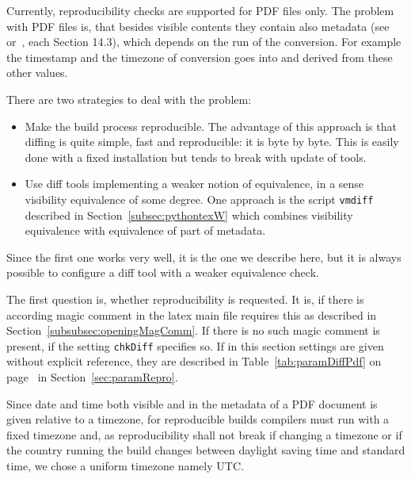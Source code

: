 Currently, reproducibility checks are supported for PDF files only. 
The problem with PDF files is, that besides visible contents 
they contain also metadata (see~\cite{Pdf17} or~\cite{Pdf20}, each Section 14.3), 
which depends on the run of the conversion. 
For example the timestamp and the timezone of conversion goes into 
and derived from these other values. 

There are two strategies to deal with the problem: 
%
\begin{itemize}
  \item 
  Make the build process reproducible. 
  The advantage of this approach is that diffing is quite simple, 
  fast and reproducible: it is byte by byte. 
  This is easily done with a fixed installation 
  but tends to break with update of tools. 
  \item 
  Use diff tools implementing a weaker notion of equivalence, 
  in a sense visibility equivalence of some degree. 
  One approach is the script \texttt{vmdiff} 
  described in Section~\ref{subsec:pythontexW} 
  which combines visibility equivalence 
  with equivalence of part of metadata. 
\end{itemize}%

Since the first one works very well, it is the one we describe here, 
but it is always possible to configure a diff tool with a weaker equivalence check. 

The first question is, whether reproducibility is requested. 
It is, if there is according magic comment in the latex main file requires this 
as described in Section~\ref{subsubsec:openingMagComm}. 
If there is no such magic comment is present, if the setting \texttt{chkDiff} specifies so. 
If in this section settings are given without explicit reference, 
they are described in Table~\ref{tab:paramDiffPdf} on page~\pageref{tab:paramDiffPdf} 
in Section~\ref{sec:paramRepro}. 

Since date and time both visible and in the metadata of a PDF document 
is given relative to a timezone, 
for reproducible builds compilers must run with a fixed timezone 
and, as reproducibility shall not break if changing a timezone 
or if the country running the build changes between daylight saving time and standard time, 
we chose a uniform timezone namely UTC. 

